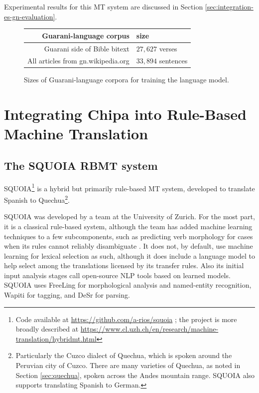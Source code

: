 Experimental results for this MT system are discussed in Section
\ref{sec:integration-es-gn-evaluation}.

\begin{figure}
  \begin{centering}
  \begin{tabulary}{\textwidth}{|R|L|}
    \hline
    Guarani-language corpus & size \\
    \hline
    Guarani side of Bible bitext &  $27,627$ verses \\
    \hline
    All articles from gn.wikipedia.org & $33,894$ sentences \\
    \hline
  \end{tabulary}
  \end{centering}
  \caption{Sizes of Guarani-language corpora for training the language model.}
  \label{fig:gn-lm-sizes}
\end{figure}

\section{Integrating Chipa into Rule-Based Machine Translation}

\subsection{The SQUOIA RBMT system}
SQUOIA\footnote{Code available at \url{https://github.com/a-rios/squoia} ;
the project is more broadly described at
\url{https://www.cl.uzh.ch/en/research/machine-translation/hybridmt.html}}
is a hybrid but primarily rule-based MT system, developed to translate Spanish
to Quechua\footnote{Particularly the Cuzco dialect of Quechua, which is spoken
around the Peruvian city of Cuzco. There are many varieties of Quechua, as
noted in Section \ref{sec:quechua}, spoken across the Andes mountain range.
SQUOIA also supports translating Spanish to German.}.

SQUOIA was developed by a team at the University of Zurich. For the most part,
it is a classical rule-based system, although the team has added machine
learning techniques to a few subcomponents, such as predicting verb morphology
for cases when its rules cannot reliably disambiguate
\cite{riosgonzales-gohring:2013:HyTra}. It does not, by default, use machine
learning for lexical selection as such, although it does include a language
model to help select among the translations licensed by its transfer rules.
Also its initial input analysis stages call open-source NLP tools based on
learned models. SQUOIA uses FreeLing \cite{padro12} for morphological analysis
and named-entity recognition, Wapiti \cite{lavergne2010practical} for tagging,
and DeSr \cite{attardi-EtAl:2007:EMNLP-CoNLL2007} for parsing.

